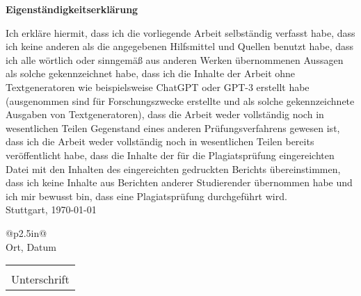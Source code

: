 \documentclass[a4paper, 12pt]{proc}
\begin{document}
\begin{center}
	\textbf{Eigenständigkeitserklärung}
\end{center}
Ich erkläre hiermit, dass ich die vorliegende Arbeit selbständig verfasst habe,
dass ich keine anderen als die angegebenen Hilfsmittel und Quellen benutzt
habe, dass ich alle wörtlich oder sinngemäß aus anderen Werken übernommenen
Aussagen als solche gekennzeichnet habe, dass ich die Inhalte der Arbeit ohne
Textgeneratoren wie beispielsweise ChatGPT oder GPT-3 erstellt habe
(ausgenommen sind für Forschungszwecke erstellte und als solche gekennzeichnete
Ausgaben von Textgeneratoren), dass die Arbeit weder vollständig noch in
wesentlichen Teilen Gegenstand eines anderen Prüfungsverfahrens gewesen ist,
dass ich die Arbeit weder vollständig noch in wesentlichen Teilen bereits
veröffentlicht habe, dass die Inhalte der für die Plagiatsprüfung eingereichten
Datei mit den Inhalten des eingereichten gedruckten Berichts übereinstimmen,
dass ich keine Inhalte aus Berichten anderer Studierender übernommen habe und
ich mir bewusst bin, dass eine Plagiatsprüfung durchgeführt wird.\\

\vspace{25mm}
\hspace{1cm}
Stuttgart, \today \\
\begin{minipage}{0.5\linewidth}
	\centering
	\begin{tabular}{@{}p{2.5in}@{}}
		\hrulefill \\
		Ort, Datum \\
	\end{tabular}
\end{minipage}
\vspace{25mm}
\begin{minipage}{0.5\linewidth}
	\centering
	\begin{tabular}{@{}p{2.5in}@{}}
		\hrulefill   \\
		Unterschrift \\
	\end{tabular}
\end{minipage}
\end{document}
